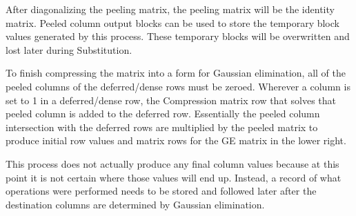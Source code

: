 After diagonalizing the peeling matrix, the peeling matrix will be the identity matrix. Peeled column output blocks can be used to store the temporary block values generated by this process. These temporary blocks will be overwritten and lost later during Substitution.

To finish compressing the matrix into a form for Gaussian elimination, all of the peeled columns of the deferred/dense rows must be zeroed. Wherever a column is set to 1 in a deferred/dense row, the Compression matrix row that solves that peeled column is added to the deferred row. Essentially the peeled column intersection with the deferred rows are multiplied by the peeled matrix to produce initial row values and matrix rows for the GE matrix in the lower right.

This process does not actually produce any final column values because at this point it is not certain where those values will end up. Instead, a record of what operations were performed needs to be stored and followed later after the destination columns are determined by Gaussian elimination. 
